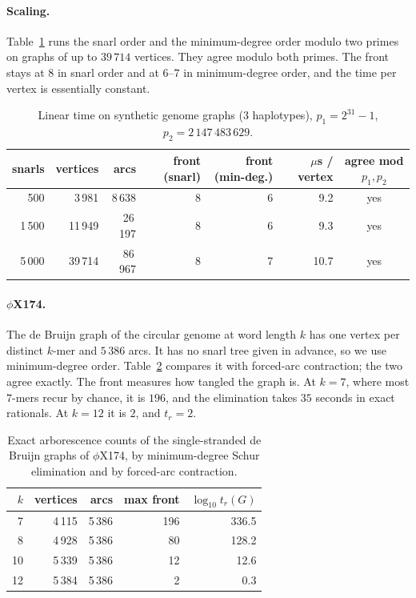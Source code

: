 \documentclass[11pt]{article}
\theoremstyle{plain}
\theoremstyle{definition}
\theoremstyle{remark}
\begin{document}
\paragraph{Scaling.} Table~\ref{tab:scale} runs the snarl order and the minimum-degree order modulo two
primes on graphs of up to $39\,714$ vertices. They agree modulo both primes. The front stays at $8$ in
snarl order and at $6$--$7$ in minimum-degree order, and the time per vertex is essentially constant.

\begin{table}[t]
\centering\small
\begin{tabular}{rrrrrrc}
\toprule
snarls & vertices & arcs & front (snarl) & front (min-deg.) & $\mu$s / vertex & agree mod $p_1,p_2$\\
\midrule
500 & 3\,981 & 8\,638 & 8 & 6 & 9.2 & yes\\
1\,500 & 11\,949 & 26\,197 & 8 & 6 & 9.3 & yes\\
5\,000 & 39\,714 & 86\,967 & 8 & 7 & 10.7 & yes\\
\bottomrule
\end{tabular}
\caption{Linear time on synthetic genome graphs ($3$ haplotypes), $p_1=2^{31}-1$, $p_2=2\,147\,483\,629$.}
\label{tab:scale}
\end{table}

\paragraph{$\phi$X174.} The de Bruijn graph of the circular genome at word length $k$ has one vertex per
distinct $k$-mer and $5\,386$ arcs. It has no snarl tree given in advance, so we use minimum-degree order.
Table~\ref{tab:phix} compares it with forced-arc contraction; the two agree exactly. The front measures
how tangled the graph is. At $k=7$, where most $7$-mers recur by chance, it is $196$, and the elimination
takes $35$ seconds in exact rationals. At $k=12$ it is $2$, and $t_r=2$.

\begin{table}[t]
\centering\small
\begin{tabular}{rrrrr}
\toprule
$k$ & vertices & arcs & max front & $\log_{10}t_r(G)$\\
\midrule
7 & 4\,115 & 5\,386 & 196 & 336.5\\
8 & 4\,928 & 5\,386 & 80 & 128.2\\
10 & 5\,339 & 5\,386 & 12 & 12.6\\
12 & 5\,384 & 5\,386 & 2 & 0.3\\
\bottomrule
\end{tabular}
\caption{Exact arborescence counts of the single-stranded de Bruijn graphs of $\phi$X174, by
minimum-degree Schur elimination and by forced-arc contraction.}\label{tab:phix}
\end{table}
\end{document}
